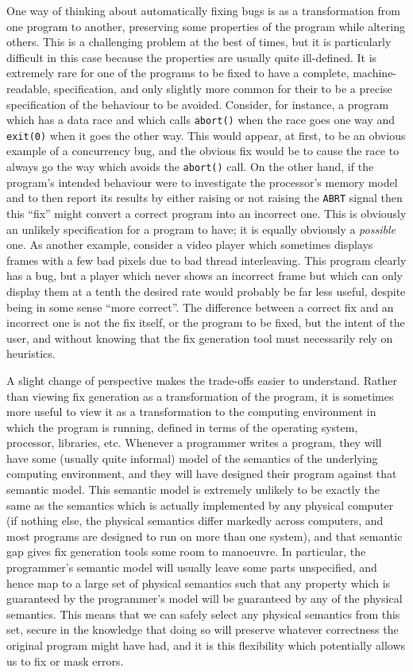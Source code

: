 One way of thinking about automatically fixing bugs is as a
transformation from one program to another, preserving some properties
of the program while altering others.  This is a challenging problem
at the best of times, but it is particularly difficult in this case
because the properties are usually quite ill-defined.  It is extremely
rare for one of the programs to be fixed to have a complete,
machine-readable, specification, and only slightly more common for
their to be a precise specification of the behaviour to be avoided.
Consider, for instance, a program which has a data race and which
calls \texttt{abort()} when the race goes one way and \texttt{exit(0)}
when it goes the other way.  This would appear, at first, to be an
obvious example of a concurrency bug, and the obvious fix would be to
cause the race to always go the way which avoids the \texttt{abort()}
call.  On the other hand, if the program's intended behaviour were to
investigate the processor's memory model and to then report its
results by either raising or not raising the \texttt{ABRT} signal then
this ``fix'' might convert a correct program into an incorrect one.
This is obviously an unlikely specification for a program to have; it
is equally obviously a \emph{possible} one.  As another example,
consider a video player which sometimes displays frames with a few bad
pixels due to bad thread interleaving.  This program clearly has a
bug, but a player which never shows an incorrect frame but which can
only display them at a tenth the desired rate would probably be far
less useful, despite being in some sense ``more correct''.  The
difference between a correct fix and an incorrect one is not the fix
itself, or the program to be fixed, but the intent of the user, and
without knowing that the fix generation tool must necessarily rely on
heuristics.

A slight change of perspective makes the trade-offs easier to
understand.  Rather than viewing fix generation as a transformation of
the program, it is sometimes more useful to view it as a
transformation to the computing environment in which the program is
running, defined in terms of the operating system, processor,
libraries, etc.  Whenever a programmer writes a program, they will
have some (usually quite informal) model of the semantics of the
underlying computing environment, and they will have designed their
program against that semantic model.  This semantic model is extremely
unlikely to be exactly the same as the semantics which is actually
implemented by any physical computer (if nothing else, the physical
semantics differ markedly across computers, and most programs are
designed to run on more than one system), and that semantic gap gives
fix generation tools some room to manoeuvre.  In particular, the
programmer's semantic model will usually leave some parts unspecified,
and hence map to a large set of physical semantics such that any
property which is guaranteed by the programmer's model will be
guaranteed by any of the physical semantics.  This means that we can
safely select any physical semantics from this set, secure in the
knowledge that doing so will preserve whatever correctness the
original program might have had, and it is this flexibility which
potentially allows us to fix or mask errors.

